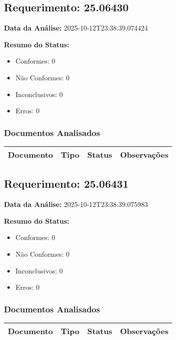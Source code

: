 \documentclass[12pt,a4paper]{article}
\begin{document}
\subsection{Requerimento: 25.06430}

\textbf{Data da Análise:} 2025-10-12T23:38:39.074424

\textbf{Resumo do Status:}
\begin{itemize}
    \item Conformes: 0
    \item Não Conformes: 0
    \item Inconclusivos: 0
    \item Erros: 0
\end{itemize}

\subsubsection{Documentos Analisados}

\begin{longtable}{|p{4cm}|p{2cm}|p{2cm}|p{6cm}|}
\hline
\textbf{Documento} & \textbf{Tipo} & \textbf{Status} & \textbf{Observações} \\
\hline
\endhead
\end{longtable}


\subsection{Requerimento: 25.06431}

\textbf{Data da Análise:} 2025-10-12T23:38:39.075983

\textbf{Resumo do Status:}
\begin{itemize}
    \item Conformes: 0
    \item Não Conformes: 0
    \item Inconclusivos: 0
    \item Erros: 0
\end{itemize}

\subsubsection{Documentos Analisados}

\begin{longtable}{|p{4cm}|p{2cm}|p{2cm}|p{6cm}|}
\hline
\textbf{Documento} & \textbf{Tipo} & \textbf{Status} & \textbf{Observações} \\
\hline
\endhead
\end{longtable}
\end{document}
